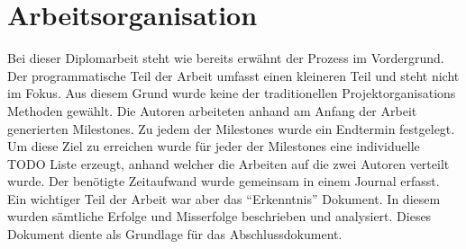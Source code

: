 \section{Arbeitsorganisation}
\label{sec:admin_orga}

Bei dieser Diplomarbeit steht wie bereits erwähnt der Prozess im Vordergrund. Der programmatische Teil der Arbeit umfasst einen kleineren Teil und steht nicht im Fokus. Aus diesem Grund wurde keine der traditionellen Projektorganisations Methoden gewählt. 
Die Autoren arbeiteten anhand am Anfang der Arbeit generierten Milestones. Zu jedem der Milestones wurde ein Endtermin festgelegt. Um diese Ziel zu erreichen wurde für jeder der Milestones eine individuelle TODO Liste erzeugt, anhand welcher die Arbeiten auf die zwei Autoren verteilt wurde. Der benötigte Zeitaufwand wurde gemeinsam in einem Journal erfasst. Ein wichtiger Teil der Arbeit war aber das "`Erkenntnis"' Dokument. In diesem wurden sämtliche Erfolge und Misserfolge beschrieben und analysiert. Dieses Dokument diente als Grundlage für das Abschlussdokument.